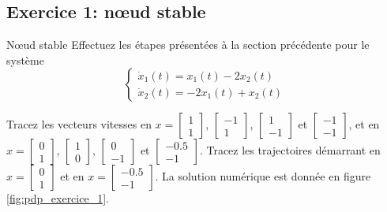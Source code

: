         \subsection{Exercice 1: nœud stable}
            \begin{exercise}{Nœud stable}
                Effectuez les étapes présentées à la section précédente pour le système
                \begin{equation}
                    \begin{cases}
                        \dot{x}_1(t) = x_1(t) - 2 x_2(t)\\
                        \dot{x}_2(t) = - 2 x_1(t) + x_2(t)
                    \end{cases}
                \end{equation}
            \end{exercise}
            Tracez les vecteurs vitesses en $x = \begin{bmatrix}1 \\ 1\end{bmatrix}$, $\begin{bmatrix}-1 \\ 1\end{bmatrix}$, $\begin{bmatrix}1 \\ -1\end{bmatrix}$ et $\begin{bmatrix}-1 \\ -1\end{bmatrix}$, et en $x = \begin{bmatrix}0 \\ 1\end{bmatrix}$, $\begin{bmatrix}1 \\ 0\end{bmatrix}$, $\begin{bmatrix}0 \\ -1\end{bmatrix}$ et $\begin{bmatrix}-0.5 \\ -1\end{bmatrix}$. Tracez les trajectoires démarrant en $x = \begin{bmatrix}0 \\ 1\end{bmatrix}$ et en $x = \begin{bmatrix}-0.5 \\ -1\end{bmatrix}$.
            La solution numérique est donnée en figure \ref{fig:pdp_exercice_1}.
